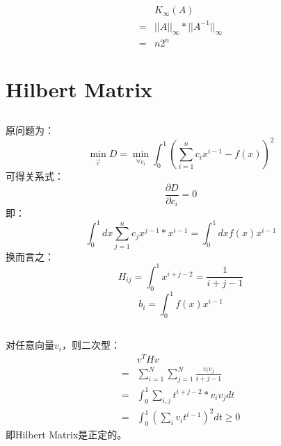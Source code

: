 \documentclass{ctexart}
\begin{document}
    \subsection{}
    \begin{align*}
        &K_\infty(A)\\
        =&||A||_\infty*||A^{-1}||_\infty\\
        =&n2^n
    \end{align*}
    \section{Hilbert Matrix}
    \subsection{}
    原问题为：
    $$\min_{\vec{c}}D=\min_{\forall c_i}{\int_0^1(\sum_{i=1}^{n}c_ix^{i-1}-f(x))^2}$$
    可得关系式：
    $$\frac{\partial D}{\partial c_i}=0$$
    即：
    $$\int_0^1dx\sum_{j=1}^{n}c_jx^{j-1}*x^{i-1}=\int_0^1dxf(x)x^{i-1}$$
    换而言之：
    $$H_{ij}=\int_0^1x^{i+j-2}=\frac{1}{i+j-1}$$
    $$b_i=\int_0^1f(x)x^{i-1}$$
    \subsection{}
    对任意向量$v_i$，则二次型：
    \begin{align*}
        &v^THv\\
        =&\sum_{i=1}^{N}\sum_{j=1}^{N}{\frac{v_iv_j}{i+j-1}}\\
        =&\int_0^1\sum_{i,j}t^{i+j-2}*v_iv_jdt\\
        =&\int_0^1(\sum_{i}{v_it^{i-1}})^2dt\geq0
    \end{align*}
    即Hilbert Matrix是正定的。
\end{document}
